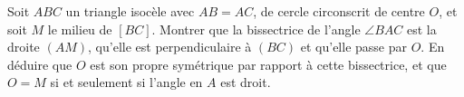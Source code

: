 Soit $ABC$ un triangle isocèle avec $AB = AC$, de cercle circonscrit de centre
$O$, et soit $M$ le milieu de $[BC]$. Montrer que la bissectrice de l'angle
$\angle BAC$ est la droite $(AM)$, qu'elle est perpendiculaire à $(BC)$ et
qu'elle passe par $O$. En déduire que $O$ est son propre symétrique par
rapport à cette bissectrice, et que $O=M$ si et seulement si l'angle en $A$
est droit.
